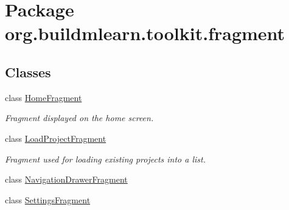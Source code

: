 \hypertarget{namespaceorg_1_1buildmlearn_1_1toolkit_1_1fragment}{\section{Package org.\-buildmlearn.\-toolkit.\-fragment}
\label{namespaceorg_1_1buildmlearn_1_1toolkit_1_1fragment}
}
\subsection*{Classes}
\begin{DoxyCompactItemize}
\item 
class \hyperlink{classorg_1_1buildmlearn_1_1toolkit_1_1fragment_1_1HomeFragment}{Home\-Fragment}
\begin{DoxyCompactList}\small\item\em Fragment displayed on the home screen. \end{DoxyCompactList}\item 
class \hyperlink{classorg_1_1buildmlearn_1_1toolkit_1_1fragment_1_1LoadProjectFragment}{Load\-Project\-Fragment}
\begin{DoxyCompactList}\small\item\em Fragment used for loading existing projects into a list. \end{DoxyCompactList}\item 
class \hyperlink{classorg_1_1buildmlearn_1_1toolkit_1_1fragment_1_1NavigationDrawerFragment}{Navigation\-Drawer\-Fragment}
\item 
class \hyperlink{classorg_1_1buildmlearn_1_1toolkit_1_1fragment_1_1SettingsFragment}{Settings\-Fragment}
\end{DoxyCompactItemize}
